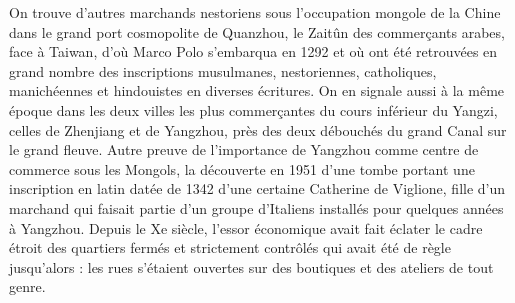On trouve d'autres marchands nestoriens sous l'occupation mongole de la
Chine dans le grand port cosmopolite de Quanzhou, le Zaitûn des
commerçants arabes, face à Taiwan, d'où Marco Polo s'embarqua en 1292 et
où ont été retrouvées en grand nombre des inscriptions musulmanes,
nestoriennes, catholiques, manichéennes et hindouistes en diverses
écritures. On en signale aussi à la même époque dans les deux villes les
plus commerçantes du cours inférieur du Yangzi, celles de Zhenjiang et
de Yangzhou, près des deux débouchés du grand Canal sur le grand fleuve.
Autre preuve de l'importance de Yangzhou comme centre de commerce sous
les Mongols, la découverte en 1951 d'une tombe portant une inscription
en latin datée de 1342 d'une certaine Catherine de Viglione, fille
d'un marchand qui faisait partie d'un groupe d'Italiens installés pour
quelques années à Yangzhou. Depuis le Xe siècle, l'essor économique
avait fait éclater le cadre étroit des quartiers fermés et strictement
contrôlés qui avait été de règle jusqu'alors : les rues s'étaient
ouvertes sur des boutiques et des ateliers de tout genre.

